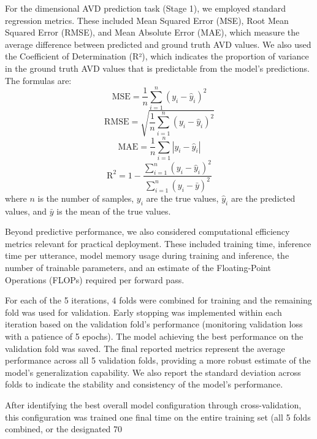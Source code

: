 \documentclass[12pt]{article}
\begin{document}
For the dimensional AVD prediction task (Stage 1), we employed standard regression metrics. These included Mean Squared Error (MSE), Root Mean Squared Error (RMSE), and Mean Absolute Error (MAE), which measure the average difference between predicted and ground truth AVD values. We also used the Coefficient of Determination (R²), which indicates the proportion of variance in the ground truth AVD values that is predictable from the model's predictions. The formulas are:
    \begin{equation}
        \text{MSE} = \frac{1}{n} \sum_{i=1}^{n} (y_i - \hat{y}_i)^2
    \end{equation}
    \begin{equation}
        \text{RMSE} = \sqrt{\frac{1}{n} \sum_{i=1}^{n} (y_i - \hat{y}_i)^2}
    \end{equation}
    \begin{equation}
        \text{MAE} = \frac{1}{n} \sum_{i=1}^{n} |y_i - \hat{y}_i|
    \end{equation}
    \begin{equation}
        \text{R}^2 = 1 - \frac{\sum_{i=1}^{n} (y_i - \hat{y}_i)^2}{\sum_{i=1}^{n} (y_i - \bar{y})^2}
    \end{equation}
where $n$ is the number of samples, $y_i$ are the true values, $\hat{y}_i$ are the predicted values, and $\bar{y}$ is the mean of the true values.

Beyond predictive performance, we also considered computational efficiency metrics relevant for practical deployment. These included training time, inference time per utterance, model memory usage during training and inference, the number of trainable parameters, and an estimate of the Floating-Point Operations (FLOPs) required per forward pass.

For each of the 5 iterations, 4 folds were combined for training and the remaining fold was used for validation. Early stopping was implemented within each iteration based on the validation fold's performance (monitoring validation loss with a patience of 5 epochs). The model achieving the best performance on the validation fold was saved. The final reported metrics represent the average performance across all 5 validation folds, providing a more robust estimate of the model's generalization capability. We also report the standard deviation across folds to indicate the stability and consistency of the model's performance.

After identifying the best overall model configuration through cross-validation, this configuration was trained one final time on the entire training set (all 5 folds combined, or the designated 70%
\end{document}
